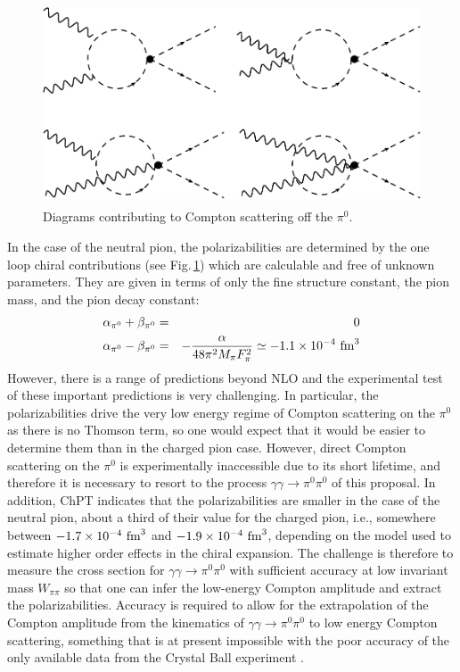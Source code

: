 \begin{figure}[h]
\begin{center}
\includegraphics[height=6cm,angle=0]{figures/DiagramsChPT.pdf}
\end{center}
\caption{Diagrams contributing to Compton scattering off the $\pi^0$.
\label{fig:digrams}}
\end{figure}


In the case of the neutral pion, the polarizabilities are determined
by the one loop chiral contributions (see Fig.\,\ref{fig:digrams})
which are calculable and free of unknown parameters. They are given in
terms of only the fine structure constant, the pion mass, and the pion decay
constant:
\begin{eqnarray}
\alpha_{\pi^0}+\beta_{\pi^0}&=&0\nonumber\\
\alpha_{\pi^0}-\beta_{\pi^0}&=&-\frac{\alpha}{48 \pi^2 M_\pi F_\pi^2}\simeq -1.1\times 10^{-4}~{\rm fm}^3
\end{eqnarray}
However, there is a range of predictions beyond
NLO and the experimental test of these important predictions is very
challenging. In particular, the polarizabilities drive the very
low energy regime of Compton scattering on the $\pi^0$ as there is no
Thomson term, so one would expect that it would be easier to determine
them than in the charged pion case.  However, direct
Compton scattering on the $\pi^0$ is experimentally inaccessible due
to its short lifetime, and therefore it is necessary to resort to the
process $\gamma\gamma\to \pi^0\pi^0$ of this proposal. In addition, ChPT
indicates that the
polarizabilities are smaller in the case of the neutral pion, about a
third of their value for the charged pion, i.e., somewhere between
$-1.7\times 10^{-4}~{\rm fm}^3$ and $-1.9\times 10^{-4}~{\rm fm}^3$,
depending on the model used to estimate higher order effects in the chiral
expansion. The challenge is therefore to measure the
cross section for $\gamma\gamma \to \pi^0\pi^0$ with sufficient
accuracy at low invariant mass $W_{\pi\pi}$ so that one can infer the
low-energy Compton amplitude and extract the polarizabilities. Accuracy is required to allow for the extrapolation of the Compton
amplitude from the kinematics of $\gamma\gamma \to \pi^0\pi^0$ to   low energy
Compton scattering, something that is at present impossible with the poor
accuracy of the only available data from the Crystal Ball experiment \cite{Marsiske:1990hx}.
 


